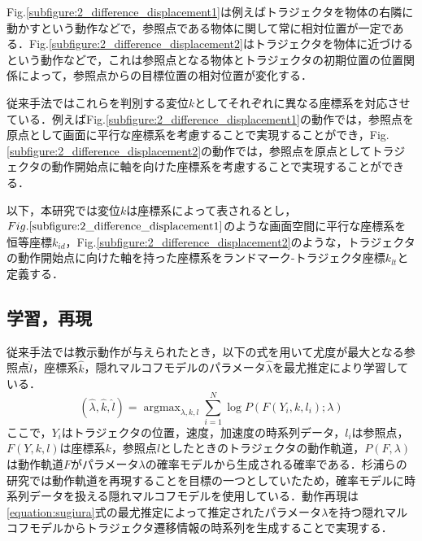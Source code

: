 Fig.\ref{subfigure:2_difference_displacement1}は例えばトラジェクタを物体の右隣に動かすという動作などで，参照点である物体に関して常に相対位置が一定である．Fig.\ref{subfigure:2_difference_displacement2}はトラジェクタを物体に近づけるという動作などで，これは参照点となる物体とトラジェクタの初期位置の位置関係によって，参照点からの目標位置の相対位置が変化する．

従来手法ではこれらを判別する変位$k$としてそれぞれに異なる座標系を対応させている．例えばFig.\ref{subfigure:2_difference_displacement1}の動作では，参照点を原点として画面に平行な座標系を考慮することで実現することができ，Fig.\ref{subfigure:2_difference_displacement2}の動作では，参照点を原点としてトラジェクタの動作開始点に軸を向けた座標系を考慮することで実現することができる．

以下，本研究では変位$k$は座標系によって表されるとし，$Fig.\ref{subfigure:2_difference_displacement1}$のような画面空間に平行な座標系を恒等座標$k_{id}$，Fig.\ref{subfigure:2_difference_displacement2}のような，トラジェクタの動作開始点に向けた軸を持った座標系をランドマーク-トラジェクタ座標$k_{lt}$と定義する．

\subsection{学習，再現}

従来手法では教示動作が与えられたとき，以下の式を用いて尤度が最大となる参照点$\hat{l}$，座標系$\hat{k}$，隠れマルコフモデルのパラメータ$\hat{λ}$を最尤推定により学習している．
\begin{equation}
	\label{equation:sugiura}
	(\hat{λ} , \hat{k} , \hat{l}) = \mathop{\arg\max}_{λ , k , l}\sum_{i=1}^{N}\log P(F(Y_{i} , k , l_{i}) ; λ)
\end{equation}
ここで，$Y_{i}$はトラジェクタの位置，速度，加速度の時系列データ，$l_{i}$は参照点，$F(Y , k , l)$は座標系$k$，参照点$l$としたときのトラジェクタの動作軌道，$P(F,λ)$は動作軌道$F$がパラメータ$λ$の確率モデルから生成される確率である．杉浦らの研究では動作軌道を再現することを目標の一つとしていたため，確率モデルに時系列データを扱える隠れマルコフモデルを使用している．動作再現は\ref{equation:sugiura}式の最尤推定によって推定されたパラメータ$λ$を持つ隠れマルコフモデルからトラジェクタ遷移情報の時系列を生成することで実現する．

